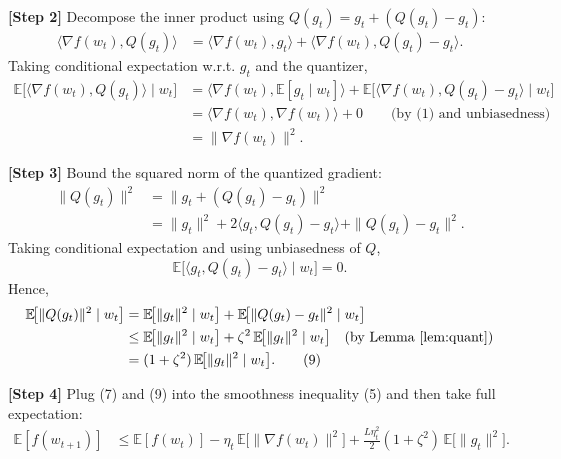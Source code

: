 \documentclass{article}
\begin{document}
\noindent\textbf{[Step 2]} Decompose the inner product using $Q(g_{t})=g_{t}+(Q(g_{t})-g_{t})$:
\begin{align}
\langle \nabla f(w_{t}),Q(g_{t})\rangle
&= \langle \nabla f(w_{t}),g_{t}\rangle
   +\langle \nabla f(w_{t}),Q(g_{t})-g_{t}\rangle. \tag{6}
\end{align}
Taking conditional expectation w.r.t. $g_{t}$ and the quantizer,
\begin{align}
\mathbb{E}\!\big[\langle \nabla f(w_{t}),Q(g_{t})\rangle\mid w_{t}\big]
&= \langle \nabla f(w_{t}),\mathbb{E}[g_{t}\mid w_{t}]\rangle
   +\mathbb{E}\!\big[\langle \nabla f(w_{t}),Q(g_{t})-g_{t}\rangle\mid w_{t}\big]\nonumber\\
&= \langle \nabla f(w_{t}),\nabla f(w_{t})\rangle +0 \qquad\text{(by (1) and unbiasedness)}\nonumber\\
&= \|\nabla f(w_{t})\|^{2}. \tag{7}
\end{align}

\noindent\textbf{[Step 3]} Bound the squared norm of the quantized gradient:
\begin{align}
\|Q(g_{t})\|^{2}
&= \|g_{t}+(Q(g_{t})-g_{t})\|^{2}\nonumber\\
&= \|g_{t}\|^{2}+2\langle g_{t},Q(g_{t})-g_{t}\rangle+\|Q(g_{t})-g_{t}\|^{2}. \tag{8}
\end{align}
Taking conditional expectation and using unbiasedness of $Q$,
\[
\mathbb{E}\!\big[\langle g_{t},Q(g_{t})-g_{t}\rangle\mid w_{t}\big]=0 .
\]
Hence,
\begin{align}
\mathbb{E}\!\big[\|Q(g_{t})\|^{2}\mid w_{t}\big]
&= \mathbb{E}\!\big[\|g_{t}\|^{2}\mid w_{t}\big]
   +\mathbb{E}\!\big[\|Q(g_{t})-g_{t}\|^{2}\mid w_{t}\big]\nonumber\\
&\le \mathbb{E}\!\big[\|g_{t}\|^{2}\mid w_{t}\big]
   +\zeta^{2}\,\mathbb{E}\!\big[\|g_{t}\|^{2}\mid w_{t}\big] \quad\text{(by Lemma~\ref{lem:quant})}\nonumber\\
&= (1+\zeta^{2})\,\mathbb{E}\!\big[\|g_{t}\|^{2}\mid w_{t}\big]. \tag{9}
\end{align}

\noindent\textbf{[Step 4]} Plug (7) and (9) into the smoothness inequality (5) and then take full expectation:
\begin{align}
\mathbb{E}[f(w_{t+1})]
&\le \mathbb{E}[f(w_{t})]
   -\eta_{t}\,\mathbb{E}\!\big[\|\nabla f(w_{t})\|^{2}\big]
   +\frac{L\eta_{t}^{2}}{2}(1+\zeta^{2})\,
     \mathbb{E}\!\big[\|g_{t}\|^{2}\big]. \tag{10}
\end{align}
\end{document}
